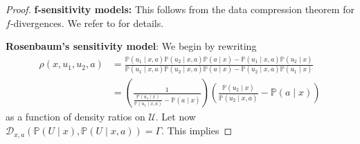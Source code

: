 \documentclass{article} %
\theoremstyle{definition}
\theoremstyle{plain}
\begin{document}
\begin{proof}
\textbf{f-sensitivity models:} This follows from the data compression theorem for $f$-divergences. We refer to \citet{Polyanskiy.2022} for details.

\textbf{Rosenbaum's sensitivity model}: We begin by rewriting
\begin{align}
    \rho(x, u_1, u_2, a) &= \frac{\mathbb{P}(u_1 \mid x, a) \mathbb{P}(u_2 \mid x, a) \mathbb{P}(a \mid x) - \mathbb{P}(u_1 \mid x, a) \mathbb{P}(u_2 \mid x)}{\mathbb{P}(u_1 \mid x, a) \mathbb{P}(u_2 \mid x, a) \mathbb{P}(a \mid x) - \mathbb{P}(u_2 \mid x, a) \mathbb{P}(u_1 \mid x)}\\
    &= \left(\frac{1}{\frac{\mathbb{P}(u_1 \mid x)}{\mathbb{P}(u_1 \mid x, a)} - \mathbb{P}(a \mid x)} \right) \left( \frac{\mathbb{P}(u_2 \mid x)}{\mathbb{P}(u_2 \mid x, a)} - \mathbb{P}(a \mid x)\right)
\end{align}
as a function of density ratios on $\mathcal{U}$. Let now $\mathcal{D}_{x, a}(\mathbb{P}(U \mid x), \mathbb{P}(U \mid x, a)) = \Gamma$. This implies


\end{proof}
\end{document}
